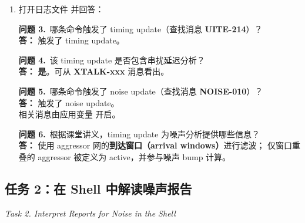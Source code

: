 \begin{enumerate}
  \item 打开日志文件  并回答：
\begin{questionBox}
\textbf{问题 3.}\ 哪条命令触发了 timing update（查找消息 \textbf{UITE-214}）？\\[0.35em]
\textbf{答：}  触发了 timing update。

\textbf{问题 4.}\ 该 timing update 是否包含串扰延迟分析？\\[0.35em]
\textbf{答：} \textbf{是}。可从 \textbf{XTALK-xxx} 消息看出。

\textbf{问题 5.}\ 哪条命令触发了 noise update（查找消息 \textbf{NOISE-010}）？\\[0.35em]
\textbf{答：}  触发了 noise update。\\
相关消息由应用变量  开启。

\textbf{问题 6.}\ 根据课堂讲义，timing update 为噪声分析提供哪些信息？\\[0.35em]
\textbf{答：} 使用 aggressor 网的\textbf{到达窗口（arrival windows）}进行滤波；
仅窗口重叠的 aggressor 被定义为 active，并参与噪声 bump 计算。
\end{questionBox}
\end{enumerate}

\subsection{任务 2：在 Shell 中解读噪声报告}
\label{lab9:task2}

\noindent\textit{Task 2. Interpret Reports for Noise in the Shell}

